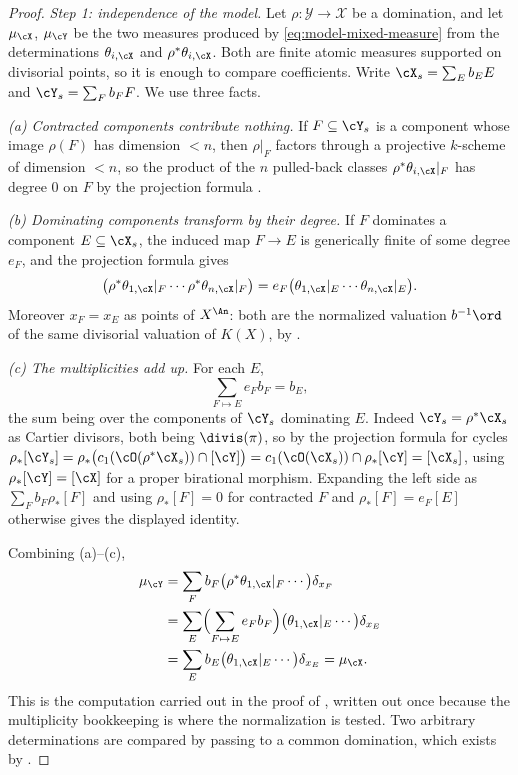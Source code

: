 \begin{proof}
\emph{Step 1: independence of the model.}  Let \(\rho:\mathcal Y\to\mathcal
X\) be a domination, and let \(\mu_{\cX}\), \(\mu_{\cY}\) be the two
measures produced by \eqref{eq:model-mixed-measure} from the determinations
\(\theta_{i,\cX}\) and \(\rho^*\theta_{i,\cX}\).  Both are finite atomic
measures supported on divisorial points, so it is enough to compare
coefficients.  Write \(\cX_s=\sum_Eb_EE\) and \(\cY_s=\sum_Fb_FF\).  We use
three facts.

\emph{(a) Contracted components contribute nothing.}  If \(F\subseteq\cY_s\)
is a component whose image \(\rho(F)\) has dimension \(<n\), then
\(\rho|_F\) factors through a projective \(k\)-scheme of dimension \(<n\), so
the product of the \(n\) pulled-back classes
\(\rho^*\theta_{i,\cX}|_F\) has degree \(0\) on \(F\) by the projection
formula .

\emph{(b) Dominating components transform by their degree.}  If \(F\)
dominates a component \(E\subseteq\cX_s\), the induced map \(F\to E\) is
generically finite of some degree \(e_F\), and the projection formula gives
\[
 \bigl(\rho^*\theta_{1,\cX}|_F\cdots\rho^*\theta_{n,\cX}|_F\bigr)
 =e_F\bigl(\theta_{1,\cX}|_E\cdots\theta_{n,\cX}|_E\bigr).
\]
Moreover \(x_F=x_E\) as points of \(X^{\An}\): both are the normalized
valuation \(b^{-1}\ord\) of the same divisorial valuation of \(K(X)\), by
.

\emph{(c) The multiplicities add up.}  For each \(E\),
\[
                \sum_{F\mapsto E}e_Fb_F=b_E ,
\]
the sum being over the components of \(\cY_s\) dominating \(E\).  Indeed
\(\cY_s=\rho^*\cX_s\) as Cartier divisors, both being \(\divis(\pi)\), so by
the projection formula for cycles
\(\rho_*[\cY_s]=\rho_*\bigl(c_1(\cO(\rho^*\cX_s))\cap[\cY]\bigr)
 =c_1(\cO(\cX_s))\cap\rho_*[\cY]=[\cX_s]\), using
\(\rho_*[\cY]=[\cX]\) for a proper birational morphism.  Expanding the left
side as \(\sum_Fb_F\rho_*[F]\) and using \(\rho_*[F]=0\) for contracted
\(F\) and \(\rho_*[F]=e_F[E]\) otherwise gives the displayed identity.

Combining (a)--(c),
\[
 \begin{aligned}
 \mu_{\cY}
 &=\sum_Fb_F\bigl(\rho^*\theta_{1,\cX}|_F\cdots\bigr)\delta_{x_F}\\
 &=\sum_E\Bigl(\sum_{F\mapsto E}e_Fb_F\Bigr)
   \bigl(\theta_{1,\cX}|_E\cdots\bigr)\delta_{x_E}\\
 &=\sum_Eb_E\bigl(\theta_{1,\cX}|_E\cdots\bigr)\delta_{x_E}
  =\mu_{\cX}.
 \end{aligned}
\]
This is the computation carried out in the proof of
, written out once because the multiplicity
bookkeeping is where the normalization is tested.  Two arbitrary
determinations are compared by passing to a common domination, which exists
by .


\end{proof}

